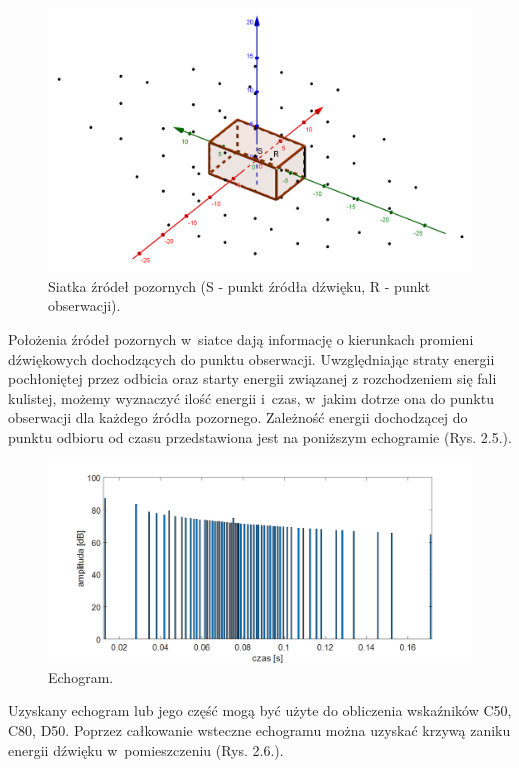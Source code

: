 \begin{figure}[H]
        \centering
                \centering
                \includegraphics[width=12cm]{rys4}
	\caption{Siatka źródeł pozornych (S - punkt źródła dźwięku, R - punkt obserwacji).}
\end{figure}

Położenia  źródeł pozornych w~siatce dają informację o kierunkach promieni dźwiękowych dochodzących do punktu obserwacji. Uwzględniając straty energii pochłoniętej przez odbicia oraz starty energii związanej z rozchodzeniem się fali kulistej, możemy wyznaczyć  ilość energii i~czas, w~jakim dotrze ona do punktu obserwacji dla każdego źródła pozornego. Zależność energii dochodzącej do punktu odbioru od czasu przedstawiona jest na poniższym echogramie (Rys. 2.5.).

\begin{figure}[H]
        \centering
                \centering
                \includegraphics[width=16cm]{rys5}
	\caption{Echogram.}
\end{figure}

Uzyskany echogram lub jego część mogą być użyte do obliczenia wskaźników C50, C80, D50. Poprzez całkowanie wsteczne echogramu można uzyskać krzywą zaniku energii dźwięku w~pomieszczeniu (Rys. 2.6.).

